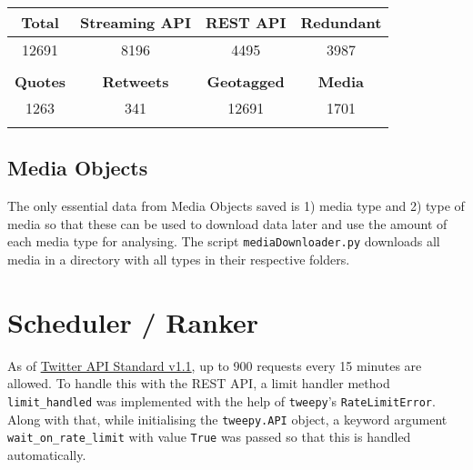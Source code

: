 \documentclass{article}
\newcommand{\code}[1]{\texttt{#1}}
\begin{document}
\begin{table}[htb]
\centering
\begin{tabular}{|c|c|c|c|}
\hline
\textbf{Total}  & \textbf{Streaming API} & \textbf{REST API}  & \textbf{Redundant}   \\ \hline
12691           & 8196                   & 4495               & 3987                 \\
                &                        &                    &                      \\ \hline
\textbf{Quotes} & \textbf{Retweets}      & \textbf{Geotagged} & \textbf{Media}       \\ \hline
1263            & 341                    & 12691              & 1701                 \\
                &                        &                    &                      \\ \hline
\end{tabular}
\end{table}

\subsection{Media Objects}

The only essential data from Media Objects saved is 1) media type and 2) type of media so that these can be used to download data later and use the amount of each media type for analysing. The script \code{mediaDownloader.py} downloads all media in a directory with all types in their respective folders.



\newpage

\section{Scheduler / Ranker}

As of \href{https://developer.twitter.com/en/docs/twitter-api/v1/rate-limits}{Twitter API Standard v1.1}\cite{twitterrates}, up to 900 requests every 15 minutes are allowed. To handle this with the REST API, a limit handler method \code{limit\_handled} was implemented with the help of \code{tweepy}'s \code{RateLimitError}. Along with that, while initialising the \code{tweepy.API} object, a keyword argument \code{wait\_on\_rate\_limit} with value \code{True} was passed so that this is handled automatically.
\end{document}

